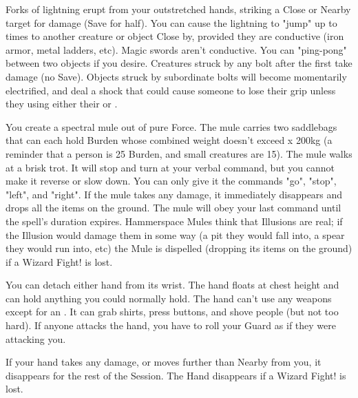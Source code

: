 Forks of lightning erupt from your outstretched hands, striking a Close or Nearby target for \SUMDICE damage (Save for half). You can cause the
lightning to "jump" up to  times to another creature or object Close by, provided they are conductive (iron armor, metal ladders, etc).  Magic
swords aren't conductive.  You can "ping-pong" between two objects if you desire. Creatures struck by any bolt after the first take \DICE damage
(no Save). Objects struck by subordinate bolts will become momentarily electrified, and deal a shock that could cause someone to lose their grip unless they \RS using either their \VIG or \FOC.



\WIZARDRY[
  Name=Hammerspace Mule,
  Link=secrets-hammerspace-mule,
  Alignment=Force,
  Save=N,
  Duration=Session,
  Counter=\mylink{Illusion}{secrets-illusion} ,
  Keywords=Hammerspace,
  Target=Close
]

You create a spectral mule out of pure Force. The mule carries two  saddlebags that can each hold \SUMDICE Burden whose combined weight doesn't exceed \DICE x 200kg (a reminder that a person is 25 Burden, and small creatures are 15).  The mule walks at a brisk trot.  It will stop and turn at your verbal command, but you cannot make it reverse or slow down. You can only give it the commands "go", "stop", "left", and "right". If the mule takes any damage, it immediately disappears and drops all the items on the ground.  The mule will obey your last command until the spell's duration expires.  Hammerspace Mules think that Illusions are real; if the Illusion would damage them in some way (a pit they would fall into, a spear they would run into, etc) the Mule is dispelled (dropping its items on the ground) if a Wizard Fight! is lost.


\WIZARDRY[
  Name=Helping Hand,
  Link=secrets-helping-hand,
  Alignment=Biomancy,
  Save=N,
  Duration=Concentration,
  Counter=\mylink{Web}{secrets-web} ,
  Keywords=None,
  Target=Self
]



You can detach either hand from its wrist.  The hand floats at chest height and can hold anything you could normally hold.  The hand can't use any weapons except for an .  It can grab shirts, press buttons, and shove people (but not too hard).  If anyone attacks the hand, you have to roll your Guard as if they were attacking you. 
 
If your hand takes any damage, or moves further than Nearby from you, it disappears for the rest of the Session. The Hand disappears if a Wizard Fight! is lost.


